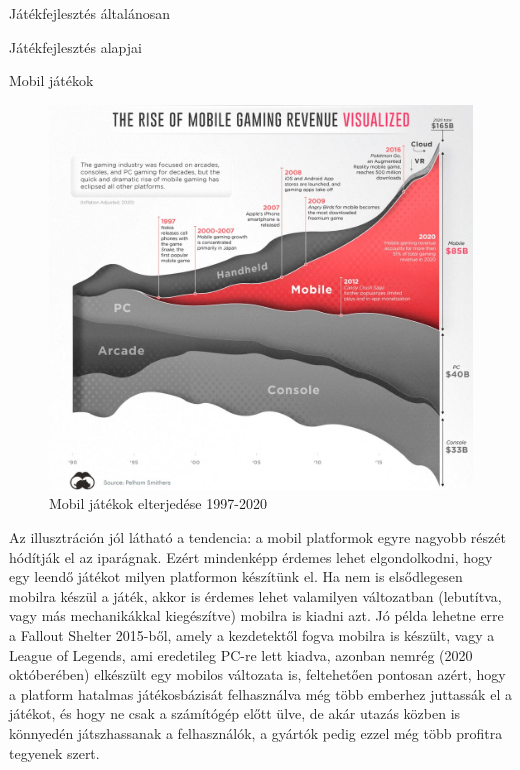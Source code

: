 \begin{MyChapter}{Játékfejlesztés általánosan}
\begin{MySection}{Játékfejlesztés alapjai}
\begin{MySubSection}{Mobil játékok}
		\begin{figure}[h!]
			\centering
			\includegraphics[scale=0.34]{kepek/mobil/Rise_of_Mobile_Gaming_Visualized.jpg}
			\caption{Mobil játékok elterjedése 1997-2020}
			\label{fig:mobil:Rise_of_Mobile_Gaming_Visualized}
		\end{figure}
		
		Az illusztráción jól látható a tendencia: a mobil platformok egyre nagyobb részét hódítják el az iparágnak. Ezért mindenképp érdemes lehet elgondolkodni, hogy egy leendő játékot milyen platformon készítünk el. Ha nem is elsődlegesen mobilra készül a játék, akkor is érdemes lehet valamilyen változatban (lebutítva, vagy más mechanikákkal kiegészítve) mobilra is kiadni azt.
		Jó példa lehetne erre a Fallout Shelter 2015-ből, amely a kezdetektől fogva mobilra is készült, vagy a League of Legends, ami eredetileg PC-re lett kiadva, azonban nemrég (2020 októberében) elkészült egy mobilos változata is, feltehetően pontosan azért, hogy a platform hatalmas játékosbázisát felhasználva még több emberhez juttassák el a játékot, és hogy ne csak a számítógép előtt ülve, de akár utazás közben is könnyedén játszhassanak a felhasználók, a gyártók pedig ezzel még több profitra tegyenek szert.


\end{MySubSection}
\end{MySection}
\end{MyChapter}
